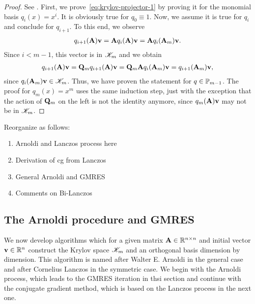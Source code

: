 \begin{proof}
  See \cite[Proposition 6.3]{Saad00}.  First, we
  prove~\eqref{eq:krylov-projector-1} by proving it for the monomial
  basis $q_i(x) = x^i$. It is obviously true for $q_0\equiv 1$. Now,
  we assume it is true for $q_i$ and conclude for $q_{i+1}$. To this
  end, we observe
  \begin{gather}
    q_{i+1}(\mata)\vv = \mata q_i(\mata)\vv = \mata q_i(\mata_m)\vv.
  \end{gather}
  Since $i<m-1$, this vector is in $\krylov_m$ and we obtain
  \begin{gather}
    q_{i+1}(\mata)\vv
    = \matq_m q_{i+1}(\mata)\vv
    = \matq_m \mata q_i(\mata_m)\vv
    = q_{i+1}(\mata_m)\vv,
  \end{gather}
  since $q_i(\mata_m)\vv\in\krylov_m$. Thus, we have proven the
  statement for $q\in\P_{m-1}$. The proof for $q_{m}(x) = x^m$ uses
  the same induction step, just with the exception that the action of
  $\matq_m$ on the left is not the identity anymore, since
  $q_m(\mata)\vv$ may not be in $\krylov_m$.
\end{proof}

\begin{todo}
  Reorganize as follows:
  \begin{enumerate}
  \item Arnoldi and Lanczos process here
  \item Derivation of cg from Lanczos
  \item General Arnoldi and GMRES
  \item Comments on Bi-Lanczos
  \end{enumerate}
\end{todo}

\subsection{The Arnoldi procedure and GMRES}

\begin{intro}
  We now develop algorithms which for a given matrix $\mata\in\Rnn$
  and initial vector $\vv\in\R^n$ construct the Krylov space
  $\krylov_m$ and an orthogonal basis dimension by dimension. This
  algorithm is named after Walter E. Arnoldi in the general case and
  after Cornelius Lanczos in the symmetric case. We begin with the
  Arnoldi process, which leads to the GMRES iteration in thsi section
  and continue with the conjugate gradient method, which is based on
  the Lanczos process in the next one.
\end{intro}


